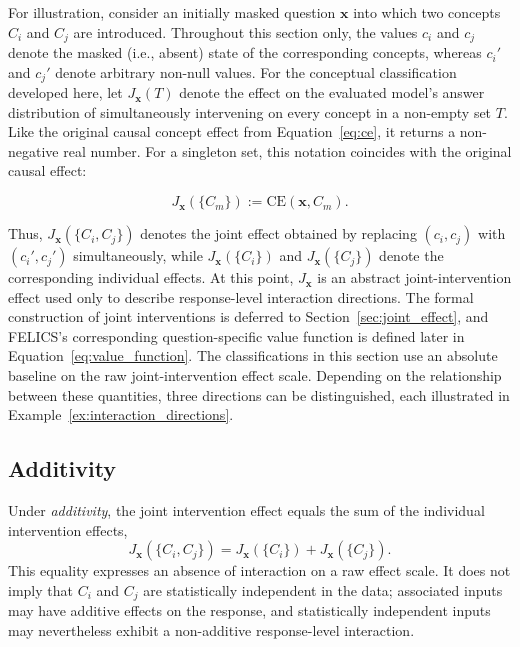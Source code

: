 For illustration, consider an initially masked question $\mathbf{x}$ into which two concepts $C_i$ and $C_j$ are introduced. Throughout this section only, the values $c_i$ and $c_j$ denote the masked (i.e., absent) state of the corresponding concepts, whereas $c_i'$ and $c_j'$ denote arbitrary non-null values. For the conceptual classification developed here, let $J_{\mathbf{x}}(T)$ denote the effect on the evaluated model's answer distribution of simultaneously intervening on every concept in a non-empty set $T$. Like the original causal concept effect from Equation~\ref{eq:ce}, it returns a non-negative real number. For a singleton set, this notation coincides with the original causal effect:

\begin{equation}
	J_{\mathbf{x}}(\{C_m\}) := \mathrm{CE}(\mathbf{x},C_m).
\end{equation}

Thus, $J_{\mathbf{x}}(\{C_i,C_j\})$ denotes the joint effect obtained by replacing $(c_i,c_j)$ with $(c_i',c_j')$ simultaneously, while $J_{\mathbf{x}}(\{C_i\})$ and $J_{\mathbf{x}}(\{C_j\})$ denote the corresponding individual effects. At this point, $J_{\mathbf{x}}$ is an abstract joint-intervention effect used only to describe response-level interaction directions. The formal construction of joint interventions is deferred to Section~\ref{sec:joint_effect}, and FELICS's corresponding question-specific value function is defined later in Equation~\ref{eq:value_function}. The classifications in this section use an absolute baseline on the raw joint-intervention effect scale. Depending on the relationship between these quantities, three directions can be distinguished, each illustrated in Example~\ref{ex:interaction_directions}.

\subsection{Additivity}
Under \emph{additivity}, the joint intervention effect equals the sum of the individual intervention effects,
\begin{equation}
	J_{\mathbf{x}}(\{C_i,C_j\}) = J_{\mathbf{x}}(\{C_i\})+J_{\mathbf{x}}(\{C_j\}).
\end{equation}
This equality expresses an absence of interaction on a raw effect scale. It does not imply that $C_i$ and $C_j$ are statistically independent in the data; associated inputs may have additive effects on the response, and statistically independent inputs may nevertheless exhibit a non-additive response-level interaction.

